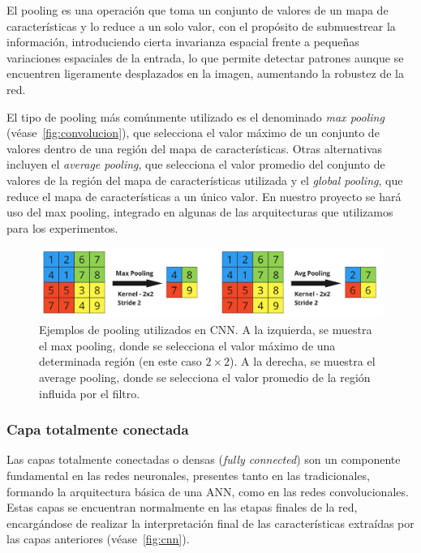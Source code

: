 El pooling es una operación que toma un conjunto de valores de un mapa de características y lo reduce a un solo valor, con el propósito de submuestrear la información, introduciendo cierta invarianza espacial frente a pequeñas variaciones espaciales de la entrada, lo que permite detectar patrones aunque se encuentren ligeramente desplazados en la imagen, aumentando la robustez de la red.\newline

El tipo de pooling más comúnmente utilizado es el denominado \emph{max pooling} (véase~\autoref{fig:convolucion}), que selecciona el valor máximo de un conjunto de valores dentro de una región del mapa de características. Otras alternativas incluyen el \emph{average pooling}, que selecciona el valor promedio del conjunto de valores de la región del mapa de características utilizada y el \emph{global pooling}, que reduce el mapa de características a un único valor. En nuestro proyecto se hará uso del max pooling, integrado en algunas de las arquitecturas que utilizamos para los experimentos.\newline

\begin{figure}[h]
    \centering
    \includegraphics[width=0.8\linewidth]{img/pooling.png}
    \caption[Ejemplos de pooling utilizados en CNN.]{Ejemplos de pooling utilizados en CNN. A la izquierda, se muestra el max pooling, donde se selecciona el valor máximo de una determinada región (en este caso $2 \times 2$). A la derecha, se muestra el average pooling, donde se selecciona el valor promedio de la región influida por el filtro.}\label{fig:pooling}
\end{figure}

\subsubsection{Capa totalmente conectada}

Las capas totalmente conectadas o densas (\emph{fully connected}) son un componente fundamental en las redes neuronales, presentes tanto en las tradicionales, formando la arquitectura básica de una ANN, como en las redes convolucionales. Estas capas se encuentran normalmente en las etapas finales de la red, encargándose de realizar la interpretación final de las características extraídas por las capas anteriores (véase~\autoref{fig:cnn}).\newline

